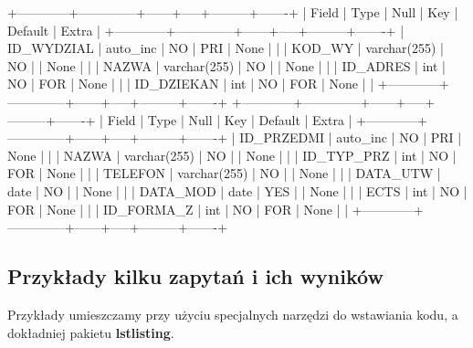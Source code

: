 \documentclass[12pt,a4paper]{article}
\newenvironment{sqltable}%
{\snugshade\verbatim}%
{\endverbatim\endsnugshade}
\begin{document}
\begin{sqltable}
+------------+--------------+------+-----+---------+-------+
| Field      | Type         | Null | Key | Default | Extra |
+------------+--------------+------+-----+---------+-------+
| ID_WYDZIAL | auto_inc	    | NO   | PRI | None    |       |
| KOD_WY	    | varchar(255) | NO   |     | None    |       |
| NAZWA		     | varchar(255) | NO   |     | None    |       |
| ID_ADRES 	 | int		         | NO   | FOR | None    |   	   |
| ID_DZIEKAN | int			         | NO   | FOR | None    |   	   |   
+------------+--------------+------+-----+---------+-------+
\end{sqltable}
\newpage
\begin{sqltable}
+------------+--------------+------+-----+---------+-------+
| Field      | Type         | Null | Key | Default | Extra |
+------------+--------------+------+-----+---------+-------+
| ID_PRZEDMI | auto_inc	    | NO   | PRI | None    |       |
| NAZWA		     | varchar(255) | NO   |     | None    |       |
| ID_TYP_PRZ | int          | NO   | FOR | None    |       |
| TELEFON  	 | varchar(255) | NO   |     | None    |       |
| DATA_UTW	  | date		        | NO   |     | None    |  	    |   
| DATA_MOD	  | date   		     | YES  |     | None	   | 	     |  
| ECTS		      | int   		      | NO   | FOR | None	   | 	     |
| ID_FORMA_Z | int   		      | NO   | FOR | None	   | 	     |
+------------+--------------+------+-----+---------+-------+
\end{sqltable}



\subsection{Przykłady kilku zapytań i ich wyników}
\label{sec:ExampleResults}

Przykłady umieszczamy przy użyciu specjalnych narzędzi do wstawiania kodu, a dokładniej pakietu \textbf{lstlisting}.
\end{document}
